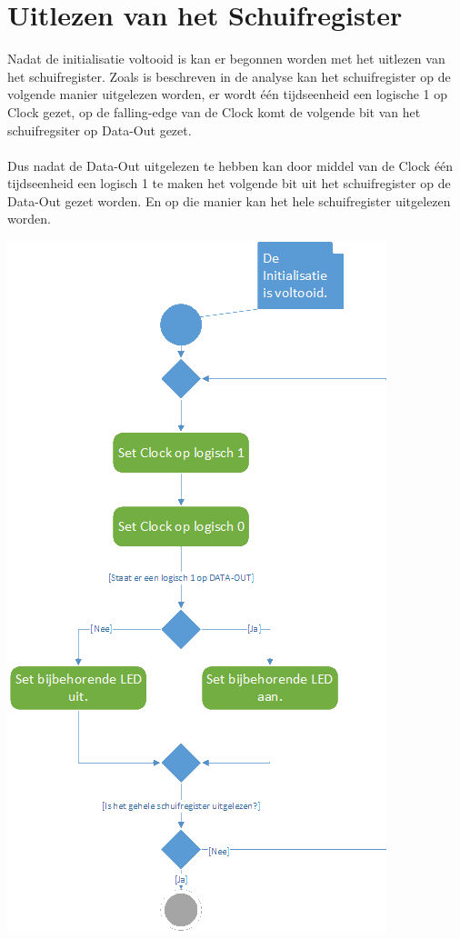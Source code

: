 \section{Uitlezen van het Schuifregister}

Nadat de initialisatie voltooid is kan er begonnen worden met het uitlezen van het schuifregister. 
Zoals is beschreven in de analyse kan het schuifregister op de volgende manier uitgelezen worden, er wordt één tijdseenheid een logische 1 op Clock gezet, op de falling-edge van de Clock komt de volgende bit van het schuifregsiter op Data-Out gezet.
\\\\
Dus nadat de Data-Out uitgelezen te hebben kan door middel van de Clock één tijdseenheid een logisch 1 te maken het volgende bit uit het schuifregister op de Data-Out gezet worden. En op die manier kan het hele schuifregister uitgelezen worden.


\begin{flushleft}
\includegraphics[scale=0.8]{./img/activity2.png}
\end{flushleft}


